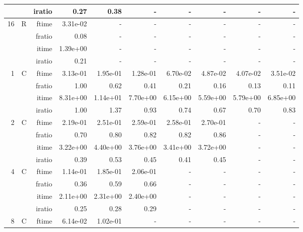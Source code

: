 \documentclass[a4paper]{article}
\begin{document}
\begin{table}[htbp]
\begin{center}
\begin{small}
\begin{tabular}{|r|r|r|r|r|r|r|r|r|r|}
          &      & iratio & 0.27 & 0.38 &     -     &     -     &     -     &     -     &     -     \\ \hline  
     16 & R & ftime & 3.31e-02 &     -     &     -     &     -     &     -     &     -     &     -     \\   
          &      & fratio & 0.08 &     -     &     -     &     -     &     -     &     -     &     -     \\   
          &      & itime & 1.39e+00 &     -     &     -     &     -     &     -     &     -     &     -     \\   
          &      & iratio & 0.21 &     -     &     -     &     -     &     -     &     -     &     -     \\ \hline  \hline
      1 & C & ftime & 3.13e-01 & 1.95e-01 & 1.28e-01 & 6.70e-02 & 4.87e-02 & 4.07e-02 & 3.51e-02 \\   
          &      & fratio & 1.00 & 0.62 & 0.41 & 0.21 & 0.16 & 0.13 & 0.11 \\   
          &      & itime & 8.31e+00 & 1.14e+01 & 7.70e+00 & 6.15e+00 & 5.59e+00 & 5.79e+00 & 6.85e+00 \\   
          &      & iratio & 1.00 & 1.37 & 0.93 & 0.74 & 0.67 & 0.70 & 0.83 \\ \hline 
     2 & C & ftime & 2.19e-01 & 2.51e-01 & 2.59e-01 & 2.58e-01 & 2.70e-01 &     -     &     -     \\   
          &      & fratio & 0.70 & 0.80 & 0.82 & 0.82 & 0.86 &     -     &     -     \\   
          &      & itime & 3.22e+00 & 4.40e+00 & 3.76e+00 & 3.41e+00 & 3.72e+00 &     -     &     -     \\   
          &      & iratio & 0.39 & 0.53 & 0.45 & 0.41 & 0.45 &     -     &     -     \\ \hline 
     4 & C & ftime & 1.14e-01 & 1.85e-01 & 2.06e-01 &     -     &     -     &     -     &     -     \\   
          &      & fratio & 0.36 & 0.59 & 0.66 &     -     &     -     &     -     &     -     \\   
          &      & itime & 2.11e+00 & 2.31e+00 & 2.40e+00 &     -     &     -     &     -     &     -     \\   
          &      & iratio & 0.25 & 0.28 & 0.29 &     -     &     -     &     -     &     -     \\ \hline 
     8 & C & ftime & 6.14e-02 & 1.02e-01 &     -     &     -     &     -     &     -     &     -     \\   

\end{tabular}
\end{small}
\end{center}
\end{table}
\end{document}
